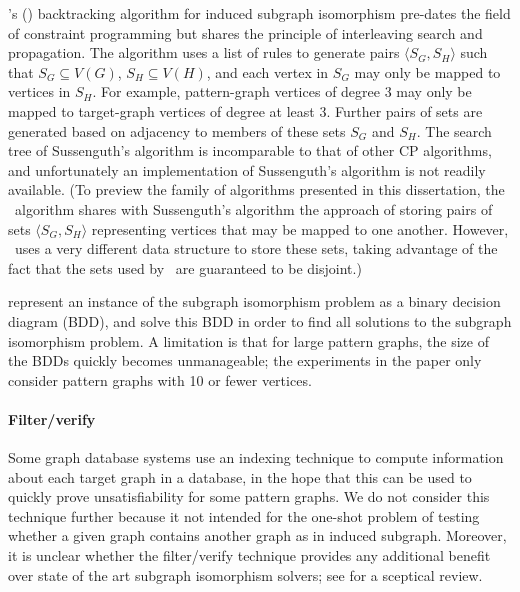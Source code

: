 \citeauthor{sussenguth1965graph}'s (\citeyear{sussenguth1965graph})
backtracking algorithm for induced subgraph
isomorphism pre-dates the field of constraint programming but shares the
principle of interleaving search and propagation.  The algorithm uses
a list of rules to generate
pairs $\langle S_G, S_H \rangle$ such that $S_G \subseteq V(G)$, $S_H \subseteq
V(H)$, and each vertex in $S_G$ may only be mapped to vertices in $S_H$.
For example, pattern-graph vertices of degree 3 may only be mapped to
target-graph vertices of degree at least 3.
Further pairs of sets are generated based on adjacency to
members of these sets $S_G$ and $S_H$.
The search tree of Sussenguth's algorithm is incomparable to that of
other CP algorithms, and unfortunately an implementation of Sussenguth's
algorithm is not readily available.
(To preview the family of algorithms
presented in this dissertation, the \McSplit\ algorithm shares with
Sussenguth's algorithm the approach of storing pairs of sets $\langle S_G, S_H
\rangle$ representing vertices that may be mapped to one another. However,
\McSplit\ uses a very different data structure to store these sets, taking
advantage of the fact that the sets used by \McSplit\ are guaranteed to be
disjoint.)

\citet{DBLP:conf/RelMiCS/CortadellaV00} represent an instance of the subgraph
isomorphism problem as a binary decision diagram (BDD), and solve this BDD
in order to find all solutions to the subgraph isomorphism problem.  A limitation
is that for large
pattern graphs, the size of the BDDs quickly becomes unmanageable; the experiments
in the paper only consider pattern graphs with 10 or fewer vertices.

\paragraph*{Filter/verify} Some graph database systems use an indexing
technique to compute information about each target graph in a database, in the
hope that this can be used to quickly prove unsatisfiability for some pattern
graphs.  We do not consider this technique further because it not intended for
the one-shot problem of testing whether a given graph contains another graph as
in induced subgraph.  Moreover, it is unclear whether the filter/verify
technique provides any additional benefit over state of the art subgraph
isomorphism solvers; see \citet{DBLP:journals/jair/McCreeshPST18} for a
sceptical review.

